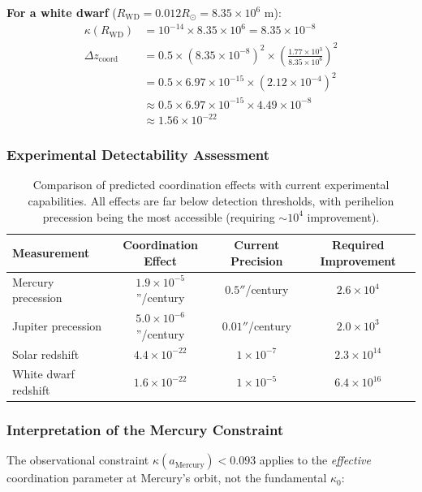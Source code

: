 \documentclass[11pt,a4paper]{article}
\begin{document}
\textbf{For a white dwarf} ($R_{\text{WD}} = 0.012 R_\odot = 8.35 \times 10^6$ m):
\begin{align}
	\kappa(R_{\text{WD}}) &= 10^{-14} \times 8.35 \times 10^6 = 8.35 \times 10^{-8} \\
	\Delta z_{\text{coord}} &= 0.5 \times (8.35 \times 10^{-8})^2 \times \left(\frac{1.77 \times 10^3}{8.35 \times 10^6}\right)^2 \\
	&= 0.5 \times 6.97 \times 10^{-15} \times (2.12 \times 10^{-4})^2 \\
	&\approx 0.5 \times 6.97 \times 10^{-15} \times 4.49 \times 10^{-8} \\
	&\approx 1.56 \times 10^{-22}
\end{align}

\subsubsection{Experimental Detectability Assessment}

\begin{table}[htbp]
	\centering
	\begin{tabular}{lccc}
		\toprule
		\textbf{Measurement} & \textbf{Coordination Effect} & \textbf{Current Precision} & \textbf{Required Improvement} \\
		\midrule
		Mercury precession & $1.9 \times 10^{-5}$''/century & $0.5''$/century & $2.6 \times 10^4$ \\
		Jupiter precession & $5.0 \times 10^{-6}$''/century & $0.01''$/century & $2.0 \times 10^3$ \\
		Solar redshift & $4.4 \times 10^{-22}$ & $1 \times 10^{-7}$ & $2.3 \times 10^{14}$ \\
		White dwarf redshift & $1.6 \times 10^{-22}$ & $1 \times 10^{-5}$ & $6.4 \times 10^{16}$ \\
		\bottomrule
	\end{tabular}
	\caption{Comparison of predicted coordination effects with current experimental capabilities. 
		All effects are far below detection thresholds, with perihelion precession being the 
		most accessible (requiring $\sim 10^4$ improvement).}
\end{table}

\subsubsection{Interpretation of the Mercury Constraint}

The observational constraint $\kappa(a_{\text{Mercury}}) < 0.093$ applies to the 
\textit{effective} coordination parameter at Mercury's orbit, not the fundamental $\kappa_0$:
\end{document}
